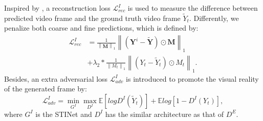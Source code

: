 Inspired by \cite{nazeri2019edgeconnect}, a reconstruction loss $\mathcal{L}^{I}_{rec}$ is used to measure the difference between predicted video frame and the ground truth video frame  $\widetilde{Y}_t$.
Differently, we penalize both coarse and fine predictions, which is defined by:
%
\begin{equation}
	\begin{aligned}
		\mathcal{L}^{I}_{rec}&=\frac{1}{\left\|\boldsymbol{M} \right\|_1}\left\|(\boldsymbol{Y}^i-\widetilde{\boldsymbol{Y}})\odot \boldsymbol{M}\right\|_1\\ &+\lambda_2*\frac{1}{\left\|M_t \right\|_1}\left\|(Y_t-\widetilde{Y}_t)\odot M_t\right\|_1.
	\end{aligned}
\end{equation}
%
Besides, an extra adversarial loss $\mathcal{L}^I_{adv}$ is introduced to promote the visual reality of the generated frame by:
\begin{equation}
	\label{eq:inp_adver}
	\mathcal{L}^I_{adv}=\min\limits_{G^I} \max \limits_{D^I}\mathbb{E}[logD^I(\widetilde{Y}_t)]+\mathbb{E}log[1-D^I(Y_{t})],
\end{equation}
where $G^I$ is the STINet and $D^I$ has the similar architecture as that of $D^E$.%


